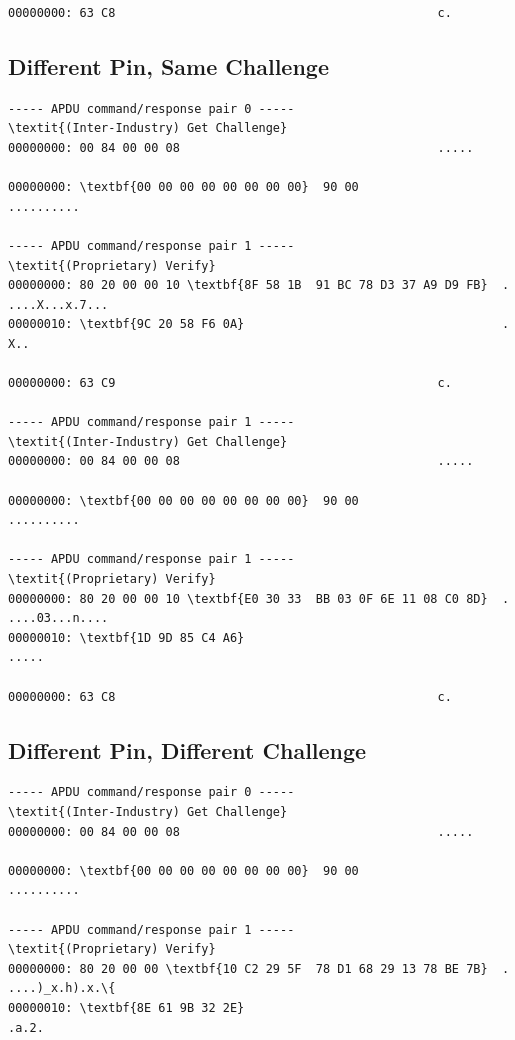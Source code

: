 \documentclass[bsc,frontabs,twoside,singlespacing,parskip,deptreport]{infthesis}     %
\begin{document}
\begin{appendices}
\begin{Verbatim}[commandchars=\\\{\}, fontsize=\small]
00000000: 63 C8                                             c.

\end{Verbatim}
\subsection{Different Pin, Same Challenge}
\begin{Verbatim}[commandchars=\\\{\}, fontsize=\small]
----- APDU command/response pair 0 -----
\textit{(Inter-Industry) Get Challenge}
00000000: 00 84 00 00 08                                    .....

00000000: \textbf{00 00 00 00 00 00 00 00}  90 00                    ..........

----- APDU command/response pair 1 -----
\textit{(Proprietary) Verify}
00000000: 80 20 00 00 10 \textbf{8F 58 1B  91 BC 78 D3 37 A9 D9 FB}  . ....X...x.7...
00000010: \textbf{9C 20 58 F6 0A}                                    . X..

00000000: 63 C9                                             c.

----- APDU command/response pair 1 -----
\textit{(Inter-Industry) Get Challenge}
00000000: 00 84 00 00 08                                    .....

00000000: \textbf{00 00 00 00 00 00 00 00}  90 00                    ..........

----- APDU command/response pair 1 -----
\textit{(Proprietary) Verify}
00000000: 80 20 00 00 10 \textbf{E0 30 33  BB 03 0F 6E 11 08 C0 8D}  . ....03...n....
00000010: \textbf{1D 9D 85 C4 A6}                                    .....

00000000: 63 C8                                             c.

\end{Verbatim}
\subsection{Different Pin, Different Challenge}
\begin{Verbatim}[commandchars=\\\{\}, fontsize=\small]
----- APDU command/response pair 0 -----
\textit{(Inter-Industry) Get Challenge}
00000000: 00 84 00 00 08                                    .....

00000000: \textbf{00 00 00 00 00 00 00 00}  90 00                    ..........

----- APDU command/response pair 1 -----
\textit{(Proprietary) Verify}
00000000: 80 20 00 00 \textbf{10 C2 29 5F  78 D1 68 29 13 78 BE 7B}  . ....)_x.h).x.\{
00000010: \textbf{8E 61 9B 32 2E}                                    .a.2.


\end{Verbatim}
\end{appendices}
\end{document}
